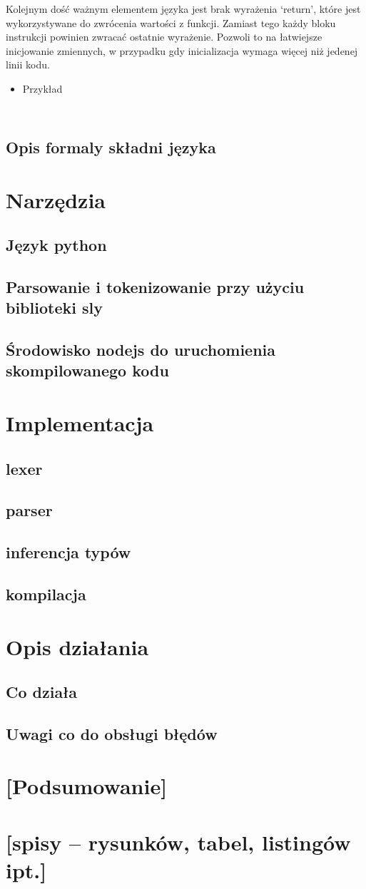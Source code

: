 \documentclass{article}
\begin{document}
\newpage
Kolejnym dość ważnym elementem języka jest brak wyrażenia `return', które jest wykorzystywane do zwrócenia wartości z funkcji. Zamiast tego każdy bloku instrukcji powinien zwracać ostatnie wyrażenie. Pozwoli to na łatwiejsze inicjowanie zmiennych, w przypadku gdy inicializacja wymaga więcej niż jedenej linii kodu.


\begin{itemize}
  \item Przykład
        \inputminted[firstline=15]{uwu.py -x}{examples/return.uwu}
        \inputminted[firstline=15]{javascript}{examples/return.uwu.js}
\end{itemize}
\subsection{Opis formaly składni języka}
\section{Narzędzia}
\subsection{Język python}
\subsection{Parsowanie i tokenizowanie przy użyciu biblioteki sly}
\subsection{Środowisko nodejs do uruchomienia skompilowanego kodu}
\section{Implementacja}
\subsection{lexer}
\subsection{parser}
\subsection{inferencja typów}
\subsection{kompilacja}
\section{Opis działania}
\subsection{Co działa}
\subsection{Uwagi co do obsługi błędów}
\section{[Podsumowanie]}
\section{[spisy -- rysunków, tabel, listingów ipt.]}


\end{document}

